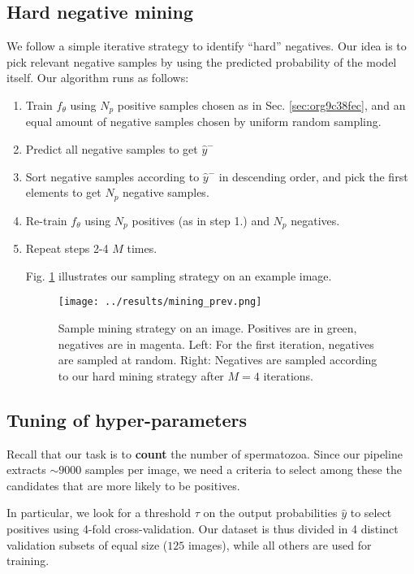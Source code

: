 \documentclass[11pt]{article}
\begin{document}
\subsection{Hard negative mining}
\label{sec:orgf138a43}

We follow a simple iterative strategy to identify ``hard'' negatives.
Our idea is to pick relevant negative samples by using the predicted probability of the model itself.
Our algorithm runs as follows:

\begin{enumerate}
\item Train \(f_\theta\) using \(N_p\) positive samples chosen as in Sec. \ref{sec:org9c38fec}, and an equal amount of negative samples
chosen by uniform random sampling.
\item Predict all negative samples to get \(\hat{y}^-\)
\item Sort negative samples according to \(\hat{y}^-\) in descending order, and pick the first elements to get \(N_p\) negative samples.
\item Re-train \(f_\theta\) using \(N_p\) positives (as in step 1.) and \(N_p\) negatives.
\item Repeat steps 2-4 \(M\) times.

Fig. \ref{fig:orgdddc4a4} illustrates our sampling strategy on an example image.

\begin{figure}[htbp]
\centering
\texttt{[image: ../results/mining\_prev.png]}
\caption{\label{fig:orgdddc4a4}Sample mining strategy on an image. Positives are in green, negatives are in magenta. Left: For the first iteration, negatives are sampled at random. Right: Negatives are sampled according to our hard mining strategy after \(M=4\) iterations.}
\end{figure}
\end{enumerate}

\subsection{Tuning of hyper-parameters}
\label{sec:org6d73f83}

Recall that our task is to \textbf{count} the number of spermatozoa.
Since our pipeline extracts \(\sim 9000\) samples per image, we need a criteria to select among these the
candidates that are more likely to be positives.

In particular, we look for a threshold \(\tau\) on the output probabilities \(\hat{y}\)
to select positives using 4-fold cross-validation.
Our dataset is thus divided in 4 distinct validation subsets of equal size (\(125\) images), while
all others are used for training.
\end{document}

